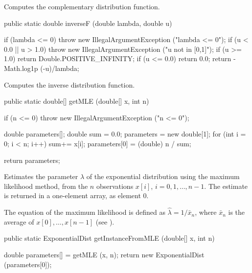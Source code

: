   \begin{tabb}
  Computes the complementary distribution function.
 \end{tabb}
\begin{code}

   public static double inverseF (double lambda, double u)\begin{hide} {
        if (lambda <= 0)
           throw new IllegalArgumentException ("lambda <= 0");
        if (u < 0.0 || u > 1.0)
            throw new IllegalArgumentException ("u not in [0,1]");
        if (u >= 1.0)
            return Double.POSITIVE_INFINITY;
        if (u <= 0.0)
            return 0.0;
        return -Math.log1p (-u)/lambda;
   }\end{hide}
\end{code}
  \begin{tabb}
  Computes the inverse distribution function.
 \end{tabb}
\begin{code}

   public static double[] getMLE (double[] x, int n)\begin{hide}
   {
      if (n <= 0)
         throw new IllegalArgumentException ("n <= 0");

      double parameters[];
      double sum = 0.0;
      parameters = new double[1];
      for (int i = 0; i < n; i++)
         sum+= x[i];
      parameters[0] = (double) n / sum;

      return parameters;
   }\end{hide}
\end{code}
\begin{tabb}
  Estimates the parameter $\lambda$ of the exponential distribution
  using the maximum likelihood method, from the $n$ observations
   $x[i]$, $i = 0, 1,\ldots, n-1$. The estimate is returned in a one-element
    array, as element 0.
   \begin{detailed}
   The equation of the maximum likelihood is defined as
    $\hat{\lambda} = 1/\bar{x}_n$, where $\bar x_n$ is the average of
     $x[0],\dots,x[n-1]$ (see \cite[page 506]{tJOH95a}).
   \end{detailed}
\end{tabb}
\begin{htmlonly}
\end{htmlonly}
\begin{code}

   public static ExponentialDist getInstanceFromMLE (double[] x, int n)\begin{hide} {
      double parameters[] = getMLE (x, n);
      return new ExponentialDist (parameters[0]);
   }\end{hide}
\end{code}

